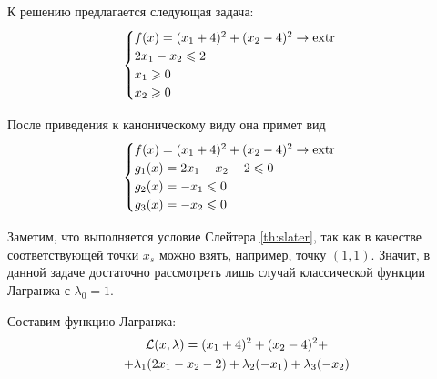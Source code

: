 К решению предлагается следующая задача:
\begin{equation}
  \label{eq:cond-optim-problem-raw}
  \begin{cases}
    f(x) = (x_1+4)^2 + (x_2-4)^2 \to \operatorname{extr} \\
    2x_1 - x_2 \leqslant 2 \\
    x_1 \geqslant 0 \\
    x_2 \geqslant 0
  \end{cases}
\end{equation}

После приведения к каноническому виду она примет вид
\begin{equation}
  \label{eq:cond-optim-problem}
  \begin{cases}
    f(x) = (x_1+4)^2 + (x_2-4)^2 \to \operatorname{extr} \\
    g_1(x) = 2x_1 - x_2 - 2 \leqslant 0 \\
    g_2(x) = -x_1 \leqslant 0 \\
    g_3(x) = -x_2 \leqslant 0
  \end{cases}
\end{equation}

Заметим, что выполняется условие Слейтера \ref{th:slater}, так как в
качестве соответствующей точки $x_s$ можно взять, например, точку $(1,
1)$. Значит, в данной задаче достаточно рассмотреть лишь случай
классической функции Лагранжа с $\lambda_0=1$.

Составим функцию Лагранжа:
\begin{multline}
  \label{eq:lagrange}
  \mathcal{L}(x, \lambda) = (x_1+4)^2 + (x_2-4)^2 +\\
  + \lambda_1(2x_1-x_2-2)+\lambda_2(-x_1)+\lambda_3(-x_2)
\end{multline}

